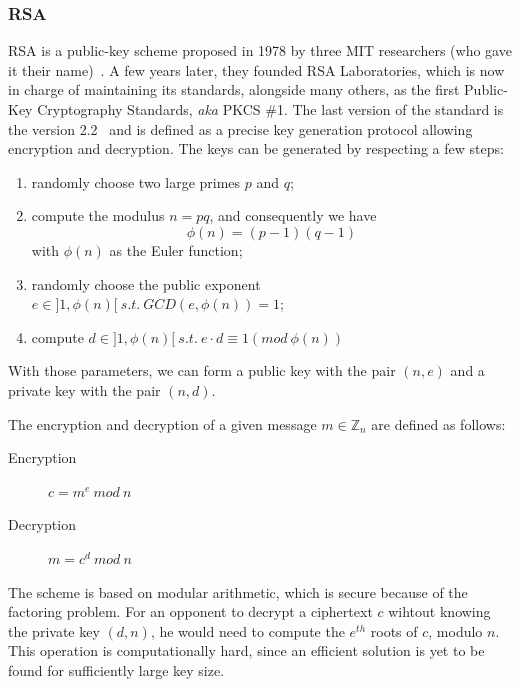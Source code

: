 \subsubsection{RSA}
RSA is a public-key scheme proposed in 1978 by three MIT researchers (who gave it their name)~\cite{Rivest:1978:MOD:359340.359342}.
A few years later, they founded RSA Laboratories, which is now in charge of maintaining its standards, alongside many others, as the first Public-Key Cryptography Standards, \textit{aka} PKCS \#1.
The last version of the standard is the version 2.2~\cite{pkcs1} and is defined as a precise key generation protocol allowing encryption and decryption.
The keys can be generated by respecting a few steps:
\begin{enumerate}
	\item randomly choose two large primes $p$ and $q$;
	\item compute the modulus $n = p q$, and consequently we have \[\phi(n) = (p-1)(q-1)\]with $\phi(n)$ as the Euler function;
	\item randomly choose the public exponent $e \in ]1,\phi(n)[\ s.t.\ GCD(e,\phi(n)) = 1$;
	\item compute $d \in ]1,\phi(n)[\ s.t.\ e \cdot d \equiv 1 (mod\ \phi(n))$
\end{enumerate}

With those parameters, we can form a public key with the pair $(n, e)$ and a private key with the pair $(n, d)$.

The encryption and decryption of a given message $m \in \mathds{Z}_n$ are defined as follows:
\begin{description}
	\item[Encryption] $c = m^e\ mod\ n$
	\item[Decryption] $m = c^d\ mod\ n$
\end{description}

The scheme is based on modular arithmetic, which is secure because of the factoring problem.
For an opponent to decrypt a ciphertext $c$ wihtout knowing the private key $(d, n)$, he would need to compute the $e^{th}$ roots of $c$, modulo $n$.
This operation is computationally hard, since an efficient solution is yet to be found for sufficiently large key size.


